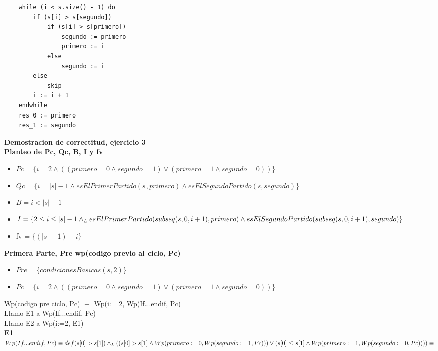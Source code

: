 \documentclass[10pt,a4paper]{article}
\begin{document}
\begin{enumerate}
\begin{lstlisting}
    while (i < s.size() - 1) do
        if (s[i] > s[segundo])
            if (s[i] > s[primero])
                segundo := primero
                primero := i
            else
                segundo := i
        else
            skip
        i := i + 1
    endwhile
    res_0 := primero
    res_1 := segundo
\end{lstlisting}

\textbf{Demostracion de correctitud, ejercicio 3}
\vspace{0.3cm}
\\
\textbf{Planteo de Pc, Qc, B, I y fv}
\begin{itemize}
\item $Pc = \{i = 2 \land ((primero = 0 \land segundo = 1) \lor (primero = 1 \land segundo = 0))\}$
\item $Qc = \{i= \vert s \vert -1 \land esElPrimerPartido(s, primero) \land esElSegundoPartido(s, segundo)\}$
\item $B = i < \vert s \vert -1$
\item $I = \{ 2\leq i \leq|s|-1 \land _L esElPrimerPartido(subseq(s, 0, i+1), primero) \land esElSegundoPartido(subseq(s, 0, i+1), segundo)\}$
\item fv = $\{(\vert s \vert -1) - i\}$
\end{itemize}
\textbf{Primera Parte, Pre \implica wp(codigo previo al ciclo, Pc)}
\begin{itemize}
\item $Pre = \{condicionesBasicas(s, 2)\}$
\item $Pc = \{i = 2 \land ((primero = 0 \land segundo = 1) \lor (primero = 1 \land segundo = 0))\}$
\end{itemize}
\vspace{0.3cm}
Wp(codigo pre ciclo, Pc) $\equiv$ Wp(i:= 2, Wp(If...endif, Pc)
\vspace{0.3cm}
\\
Llamo E1 a Wp(If...endif, Pc)
\vspace{0.3cm}
\\
Llamo E2 a Wp(i:=2, E1)
\vspace{0.3cm}
\\
\underline{\textbf{E1}}
\vspace{0.3cm}
\\
$Wp(If...endif, Pc) \equiv def(s[0] > s[1]) \land _L ((s[0] > s[1] \land Wp(primero:= 0, Wp(segundo:= 1, Pc))) \lor (s[0] \leq s[1] \land Wp(primero:= 1, Wp(segundo:= 0, Pc))))\equiv$
\vspace{0.3cm}
\\

\end{enumerate}
\end{document}
